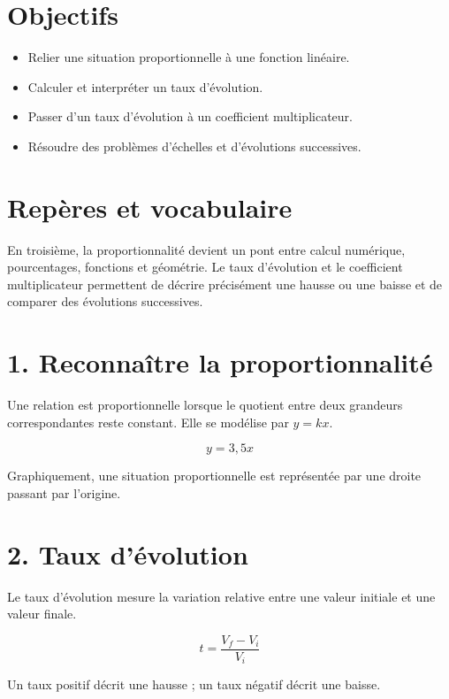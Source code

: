 
\section{Objectifs}
\begin{itemize}
\item Relier une situation proportionnelle à une fonction linéaire.
\item Calculer et interpréter un taux d’évolution.
\item Passer d’un taux d’évolution à un coefficient multiplicateur.
\item Résoudre des problèmes d’échelles et d’évolutions successives.
\end{itemize}

\section{Repères et vocabulaire}
En troisième, la proportionnalité devient un pont entre calcul numérique, pourcentages, fonctions et géométrie. Le taux d’évolution et le coefficient multiplicateur permettent de décrire précisément une hausse ou une baisse et de comparer des évolutions successives.

\section{1. Reconnaître la proportionnalité}
Une relation est proportionnelle lorsque le quotient entre deux grandeurs correspondantes reste constant. Elle se modélise par $y=kx$.

\[
y=3{,}5x
\]

\begin{exemple}
Graphiquement, une situation proportionnelle est représentée par une droite passant par l’origine.
\end{exemple}

\section{2. Taux d’évolution}
Le taux d’évolution mesure la variation relative entre une valeur initiale et une valeur finale.

\[
t=\dfrac{V_f-V_i}{V_i}
\]

\begin{exemple}
Un taux positif décrit une hausse ; un taux négatif décrit une baisse.
\end{exemple}

